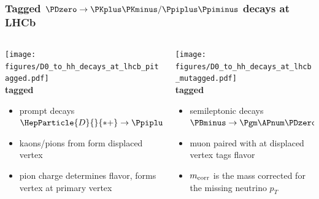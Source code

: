 \documentclass[18pt, aspectratio=169]{beamer}
\newcommand{\PDstarplus}{\HepParticle{D}{}{*+}}
\begin{document}
\begin{frame}
  \frametitle{Tagged  $\PDzero \rightarrow \PKplus\PKminus/\Ppiplus\Ppiminus$ decays at LHCb}
  \begin{columns}
    \begin{column}{.5\textwidth}
      \centering
      \texttt{[image: figures/D0\_to\_hh\_decays\_at\_lhcb\_pitagged.pdf]}\\
      \textbf{\Ppi tagged}\\
      \begin{itemize}
      \item prompt decays $\PDstarplus \rightarrow \Ppiplus\PDzero(\rightarrow h^+h^-)$
      \item kaons/pions from \PDzero form displaced vertex
      \item pion charge determines flavor, forms \PDstarplus vertex at primary vertex
      \end{itemize}
    \end{column}

    \begin{column}{.5\textwidth}
      \centering
      \texttt{[image: figures/D0\_to\_hh\_decays\_at\_lhcb\_mutagged.pdf]}\\
      \textbf{\Pgm tagged}\\
      \begin{itemize}
      \item semileptonic \PB decays $\PBminus \rightarrow \Pgm\APnum\PDzero(\rightarrow h^+h^-)$
      \item muon paired with \PDzero at displaced vertex tags flavor
      \item $m_{\rm corr}$ is the \PDzero\Pmuon mass corrected for the missing neutrino $p_T$
      \end{itemize}
    \end{column}
  \end{columns}
\end{frame}
\end{document}
